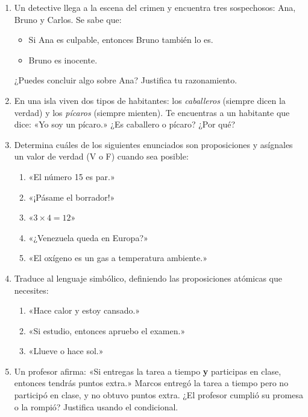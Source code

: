 \documentclass[12pt, a4paper]{article}
\begin{document}
\begin{enumerate}[leftmargin=*]
  \item \facil{} Un detective llega a la escena del crimen y encuentra tres sospechosos: Ana, Bruno y Carlos. Se sabe que:
  \begin{itemize}
    \item Si Ana es culpable, entonces Bruno también lo es.
    \item Bruno es inocente.
  \end{itemize}
  ¿Puedes concluir algo sobre Ana? Justifica tu razonamiento.

  \item \facil{} En una isla viven dos tipos de habitantes: los \emph{caballeros} (siempre dicen la verdad) y los \emph{pícaros} (siempre mienten). Te encuentras a un habitante que dice: «Yo soy un pícaro.» ¿Es caballero o pícaro? ¿Por qué?

  \item \facil{} Determina cuáles de los siguientes enunciados son proposiciones y asígnales un valor de verdad (V o F) cuando sea posible:
  \begin{enumerate}[label=\alph*)]
    \item «El número 15 es par.»
    \item «¡Pásame el borrador!»
    \item «$3 \times 4 = 12$»
    \item «¿Venezuela queda en Europa?»
    \item «El oxígeno es un gas a temperatura ambiente.»
  \end{enumerate}

  \item \facil{} Traduce al lenguaje simbólico, definiendo las proposiciones atómicas que necesites:
  \begin{enumerate}[label=\alph*)]
    \item «Hace calor y estoy cansado.»
    \item «Si estudio, entonces apruebo el examen.»
    \item «Llueve o hace sol.»
  \end{enumerate}

  \item \medio{} Un profesor afirma: «Si entregas la tarea a tiempo \textbf{y} participas en clase, entonces tendrás puntos extra.» Marcos entregó la tarea a tiempo pero no participó en clase, y no obtuvo puntos extra. ¿El profesor cumplió su promesa o la rompió? Justifica usando el condicional.


\end{enumerate}
\end{document}
